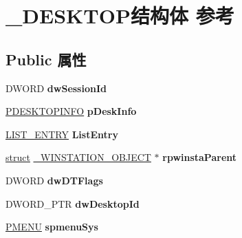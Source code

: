 \hypertarget{struct___d_e_s_k_t_o_p}{}\section{\+\_\+\+D\+E\+S\+K\+T\+O\+P结构体 参考}
\label{struct___d_e_s_k_t_o_p}
\subsection*{Public 属性}
\begin{DoxyCompactItemize}
\item 
\mbox{\label{struct___d_e_s_k_t_o_p_aebf76e585e54d795d78ac20fe514a79f}} 
D\+W\+O\+RD {\bfseries dw\+Session\+Id}
\item 
\mbox{\label{struct___d_e_s_k_t_o_p_adfe7f7bcb7aebedad837bb3d45cc267d}} 
\hyperlink{struct___d_e_s_k_t_o_p_i_n_f_o}{P\+D\+E\+S\+K\+T\+O\+P\+I\+N\+FO} {\bfseries p\+Desk\+Info}
\item 
\mbox{\label{struct___d_e_s_k_t_o_p_a5c501893410aaf5ae02d181fc57685b1}} 
\hyperlink{struct___l_i_s_t___e_n_t_r_y}{L\+I\+S\+T\+\_\+\+E\+N\+T\+RY} {\bfseries List\+Entry}
\item 
\mbox{\label{struct___d_e_s_k_t_o_p_a675ca78ecfa8821847c6a4dcc3f2105e}} 
\hyperlink{interfacestruct}{struct} \hyperlink{struct___w_i_n_s_t_a_t_i_o_n___o_b_j_e_c_t}{\+\_\+\+W\+I\+N\+S\+T\+A\+T\+I\+O\+N\+\_\+\+O\+B\+J\+E\+CT} $\ast$ {\bfseries rpwinsta\+Parent}
\item 
\mbox{\label{struct___d_e_s_k_t_o_p_adc73baac6419f8a7c8d38a26b260c67a}} 
D\+W\+O\+RD {\bfseries dw\+D\+T\+Flags}
\item 
\mbox{\label{struct___d_e_s_k_t_o_p_a072a14054e315dab0fc43369202a905c}} 
D\+W\+O\+R\+D\+\_\+\+P\+TR {\bfseries dw\+Desktop\+Id}
\item 
\mbox{\label{struct___d_e_s_k_t_o_p_aa110aa856d50f5654c27265e583eab81}} 
\hyperlink{structtag_m_e_n_u}{P\+M\+E\+NU} {\bfseries spmenu\+Sys}
\item 
\mbox{\label{struct___d_e_s_k_t_o_p_aa154ab9a56e807f5636490e61cfbb529}} 

\end{DoxyCompactItemize}

